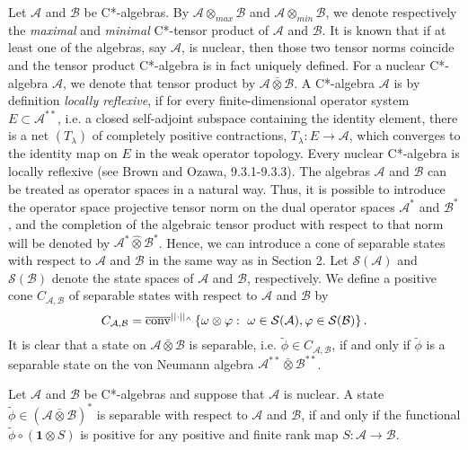 Let $\mathcal{A}$ and $\mathcal{B}$ be C*-algebras.
By $\mathcal{A} \otimes_{max} \mathcal{B}$
and $\mathcal{A} \otimes_{min} \mathcal{B}$,
we denote respectively the \emph{maximal} and \emph{minimal}
C*-tensor product of $\mathcal{A}$ and $\mathcal{B}$.
It is known that if at least one of the algebras, say $\mathcal{A}$,
is nuclear, then those two tensor norms coincide and
the tensor product C*-algebra is in fact uniquely defined.
For a nuclear C*-algebra $\mathcal{A}$, we denote that tensor product
by $\mathcal{A} \bar{\otimes} \mathcal{B}$.
A C*-algebra $\mathcal{A}$ is by definition \emph{locally reflexive},
if for every finite-dimensional operator system $E \subset \mathcal{A}^{**}$,
i.e. a closed self-adjoint subspace containing the identity element,
there is a net $(T_{\lambda})$ of completely positive contractions,
$T_{\lambda}: E \rightarrow \mathcal{A}$,
which converges to the identity map on $E$ in the weak operator
topology. Every nuclear C*-algebra is locally reflexive
(see Brown and Ozawa\cite{Brown2008}, 9.3.1-9.3.3).
The algebras $\mathcal{A}$ and $\mathcal{B}$
can be treated as operator spaces in a natural way.
Thus, it is possible to introduce the operator space projective
tensor norm on the dual operator spaces $\mathcal{A}^{*}$
and $\mathcal{B}^{*}$, and the completion of the algebraic tensor product with
respect to that norm will be denoted by
$\mathcal{A}^{*} \hat{\otimes} \mathcal{B}^{*}$. Hence, we can introduce a cone of
separable states with respect to $\mathcal{A}$ and $\mathcal{B}$ in the same way as
in Section 2. Let  $\mathcal{S}(\mathcal{A})$ and $\mathcal{S}(\mathcal{B})$
denote the state spaces of $\mathcal{A}$ and $\mathcal{B}$, respectively.
We define a positive cone $C_{\mathcal{A},\mathcal{B}}$
of separable states with respect to $\mathcal{A}$ and $\mathcal{B}$ by
\begin{equation}
C_{\mathcal{A},\mathcal{B}} =
\overline{{\rm conv}}^{||\cdot||_{\wedge}}
\left \{\omega \otimes \varphi: \, \,\omega \in \mathcal{S}(\mathcal{A}),
\varphi \in \mathcal{S}(\mathcal{B})\right \}.
\end{equation}
It is clear that a state on $\mathcal{A} \bar{\otimes} \mathcal{B}$ is separable,
i.e. $\tilde{\phi} \in C_{\mathcal{A}, \mathcal{B}}$,
if and only if $\tilde{\phi}$ is a separable state
on the von Neumann algebra $\mathcal{A}^{**} \bar{\otimes} \mathcal{B}^{**}$.
\begin{theorem}
Let $\mathcal{A}$ and $\mathcal{B}$ be C*-algebras and suppose that
$\mathcal{A}$ is nuclear. A state $\tilde{\phi} \in
(\mathcal{A} \bar{\otimes} \mathcal{B})^{*}$ is separable
with respect to $\mathcal{A}$ and $\mathcal{B}$,
if and only if the functional $\tilde{\phi} \circ ( \mathbf{1} \otimes S )$
is positive for any positive and finite rank map $S: \mathcal{A} \rightarrow \mathcal{B}$.
\end{theorem}
